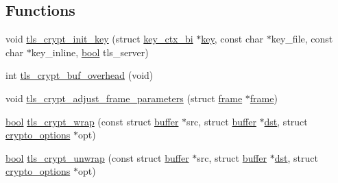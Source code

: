 \subsection*{Functions}
\begin{DoxyCompactItemize}
\item 
void \hyperlink{group__tls__crypt_gad8a8513b53a8a5346cac69063f569680}{tls\+\_\+crypt\+\_\+init\+\_\+key} (struct \hyperlink{structkey__ctx__bi}{key\+\_\+ctx\+\_\+bi} $\ast$\hyperlink{structkey}{key}, const char $\ast$key\+\_\+file, const char $\ast$key\+\_\+inline, \hyperlink{automatic_8c_abb452686968e48b67397da5f97445f5b}{bool} tls\+\_\+server)
\item 
int \hyperlink{group__tls__crypt_gac9c2ecaaf4e2af189ab15bb47a558bfa}{tls\+\_\+crypt\+\_\+buf\+\_\+overhead} (void)
\item 
void \hyperlink{group__tls__crypt_ga24b342111241c5ea9c731de4aa66fcb2}{tls\+\_\+crypt\+\_\+adjust\+\_\+frame\+\_\+parameters} (struct \hyperlink{structframe}{frame} $\ast$\hyperlink{structframe}{frame})
\item 
\hyperlink{automatic_8c_abb452686968e48b67397da5f97445f5b}{bool} \hyperlink{group__tls__crypt_gadaca5f414562a243603a60a0e3158e5a}{tls\+\_\+crypt\+\_\+wrap} (const struct \hyperlink{structbuffer}{buffer} $\ast$src, struct \hyperlink{structbuffer}{buffer} $\ast$\hyperlink{compat-lz4_8h_a961c13eb7fcda15b167b953cac1ab3ec}{dst}, struct \hyperlink{structcrypto__options}{crypto\+\_\+options} $\ast$opt)
\item 
\hyperlink{automatic_8c_abb452686968e48b67397da5f97445f5b}{bool} \hyperlink{group__tls__crypt_ga81c822ba2e5599865dddb37e01a2c20c}{tls\+\_\+crypt\+\_\+unwrap} (const struct \hyperlink{structbuffer}{buffer} $\ast$src, struct \hyperlink{structbuffer}{buffer} $\ast$\hyperlink{compat-lz4_8h_a961c13eb7fcda15b167b953cac1ab3ec}{dst}, struct \hyperlink{structcrypto__options}{crypto\+\_\+options} $\ast$opt)
\end{DoxyCompactItemize}


